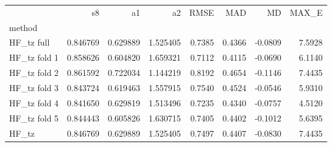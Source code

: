 \begin{tabular}{lrrrrrrr}
 & s8 & a1 & a2 & RMSE & MAD & MD & MAX_E \\
method &  &  &  &  &  &  &  \\
HF_tz full & 0.846769 & 0.629889 & 1.525405 & 0.7385 & 0.4366 & -0.0809 & 7.5928 \\
HF_tz fold 1 & 0.858626 & 0.604820 & 1.659321 & 0.7112 & 0.4115 & -0.0690 & 6.1140 \\
HF_tz fold 2 & 0.861592 & 0.722034 & 1.144219 & 0.8192 & 0.4654 & -0.1146 & 7.4435 \\
HF_tz fold 3 & 0.843724 & 0.619463 & 1.557915 & 0.7540 & 0.4524 & -0.0546 & 5.9310 \\
HF_tz fold 4 & 0.841650 & 0.629819 & 1.513496 & 0.7235 & 0.4340 & -0.0757 & 4.5120 \\
HF_tz fold 5 & 0.844443 & 0.605826 & 1.630715 & 0.7405 & 0.4402 & -0.1012 & 5.6395 \\
HF_tz & 0.846769 & 0.629889 & 1.525405 & 0.7497 & 0.4407 & -0.0830 & 7.4435 \\
\end{tabular}
